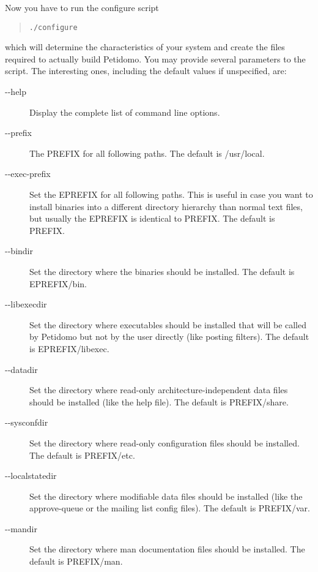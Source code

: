 \documentclass[a4paper,11pt]{scrreprt}
\newcommand{\file}[1]{{\textsf{#1}}}
\begin{document}
Now you have to run the configure script
\begin{quote}
\begin{verbatim}
./configure
\end{verbatim}
\end{quote}
which will determine the characteristics of your system and create the
files required to actually build Petidomo. You may provide several
parameters to the script. The interesting ones, including the default
values if unspecified, are:
\begin{description}

\item[{-}{-}help] Display the complete list of command line options.

\item[{-}{-}prefix] The \file{PREFIX} for all following paths. The
default is \file{/usr/local}.

\item[{-}{-}exec-prefix] Set the \file{EPREFIX} for all following
paths. This is useful in case you want to install binaries into a
different directory hierarchy than normal text files, but usually the
\file{EPREFIX} is identical to \file{PREFIX}. The default is
\file{PREFIX}.

\item[{-}{-}bindir] Set the directory where the binaries should be
installed. The default is \file{EPREFIX/bin}.

\item[{-}{-}libexecdir] Set the directory where executables should be
installed that will be called by Petidomo but not by the user directly
(like posting filters). The default is \file{EPREFIX/libexec}.

\item[{-}{-}datadir] Set the directory where read-only
architecture-independent data files should be installed (like the help
file). The default is \file{PREFIX/share}.

\item[{-}{-}sysconfdir] Set the directory where read-only
configuration files should be installed. The default is
\file{PREFIX/etc}.

\item[{-}{-}localstatedir] Set the directory where modifiable
data files should be installed (like the approve-queue or the mailing
list config files). The default is \file{PREFIX/var}.

\item[{-}{-}mandir] Set the directory where man documentation files
should be installed. The default is \file{PREFIX/man}.

\end{description}
\end{document}
